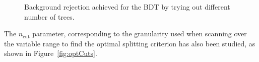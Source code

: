 \documentclass[a4paper, 10pt, openright]{report}
\begin{document}
\begin{appendices}
\begin{figure}[htbp]
{\begin{minipage}[b]{.48\textwidth}
\end{minipage} \hfill
}
\caption{Background rejection achieved for the \ac{BDT} by trying out different number of trees.}
\label{fig:optTrees}
\end{figure}

%

The $n_{\text{cut}}$ parameter, corresponding to the granularity used when scanning over the variable range to find the optimal splitting criterion has also been studied, as shown in Figure~\ref{fig:optCuts}.


\end{appendices}
\end{document}
